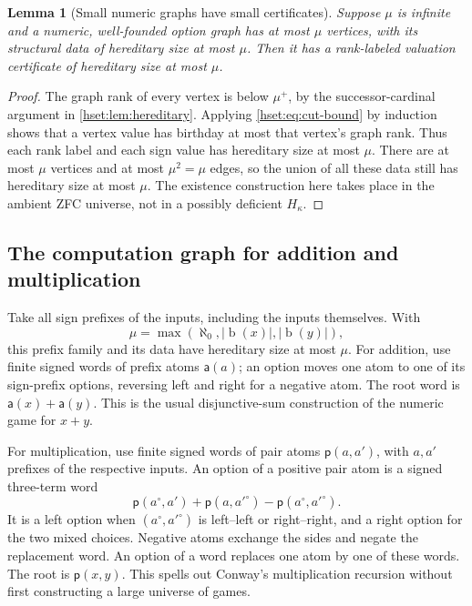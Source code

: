 \documentclass[11pt,letterpaper]{article}
\newtheorem{lemma}[lemma]{Lemma}\aliascntresetthe{lemma}
\theoremstyle{definition}
\theoremstyle{remark}
\newcommand{\bd}{\operatorname{b}}
\newcommand{\card}[1]{\lvert#1\rvert}
\begin{document}
\begin{lemma}[Small numeric graphs have small certificates]
\label{hset:lem:graph-size}
Suppose $\mu$ is infinite and a numeric, well-founded option graph has at
most $\mu$ vertices, with its structural data of hereditary size at most
$\mu$. Then it has a rank-labeled valuation certificate of hereditary size
at most $\mu$.
\end{lemma}
\begin{proof}
The graph rank of every vertex is below $\mu^+$, by the successor-cardinal
argument in \cref{hset:lem:hereditary}. Applying \eqref{hset:eq:cut-bound} by
induction shows that a vertex value has birthday at most that vertex's graph
rank. Thus each rank label and each sign value has hereditary size at most
$\mu$. There are at most $\mu$ vertices and at most $\mu^2=\mu$ edges, so the
union of all these data still has hereditary size at most $\mu$. The existence
construction here takes place in the ambient ZFC universe, not in a possibly
deficient $H_\kappa$.
\end{proof}

\subsection{The computation graph for addition and multiplication}

Take all sign prefixes of the inputs, including the inputs themselves. With
\[
 \mu=\max(\aleph_0,\card{\bd(x)},\card{\bd(y)}),
\]
this prefix family and its data have hereditary size at most $\mu$.
For addition, use finite signed words of prefix atoms $\mathsf{a}(a)$; an option moves
one atom to one of its sign-prefix options, reversing left and right for a
negative atom. The root word is $\mathsf{a}(x)+\mathsf{a}(y)$. This is the usual disjunctive-sum
construction of the numeric game for $x+y$.

For multiplication, use finite signed words of pair atoms $\mathsf{p}(a,a')$, with
$a,a'$ prefixes of the respective inputs. An option of a positive pair atom
is a signed three-term word
\begin{equation}
 \mathsf{p}(a^\circ,a')+\mathsf{p}(a,a'^\circ)-\mathsf{p}(a^\circ,a'^\circ).
 \label{hset:eq:pair-option}
\end{equation}
It is a left option when $(a^\circ,a'^\circ)$ is left--left or right--right,
and a right option for the two mixed choices. Negative atoms exchange the sides
and negate the replacement word. An option of a word replaces one atom by one
of these words. The root is $\mathsf{p}(x,y)$. This spells out Conway's multiplication
recursion without first constructing a large universe of games.
\end{document}
